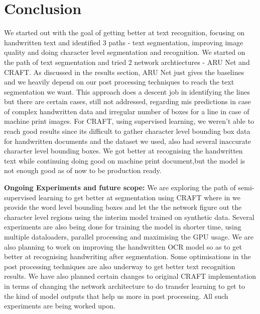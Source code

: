 %

{\let\clearpage\relax \chapter{Conclusion}}

We started out with the goal of getting better at text recognition, focusing on handwritten text and identified 3 paths - text segmentation, improving image quality and doing character level segmentation and recognition. We started on the path of text segmentation and tried 2 network archtiectures - ARU Net and CRAFT. As discussed in the results section, ARU Net just gives the baselines and we heavily depend on our post processing techniques to reach the text segmentation we want. This approach does a descent job in identifying the lines but there are certain cases, still not addressed,  regarding mis predictions in case of complex handwritten data and irregular number of boxes for a line in case of machine print images. For CRAFT, using supervised learning, we weren't able to reach good results since its difficult to gather character level bounding box data for handwritten documents and the dataset we used, also had several inaccurate character level bounding boxes. We got better at recognising the handwritten text while continuing doing good on machine print document,but the model is not enough good as of now to be production ready.

\textbf{Ongoing Experiments and future scope:} We are exploring the path of semi-supervised learning to get better at segmentation using CRAFT where in we provide the word level bounding boxes and let the the network figure out the character level regions using the interim model trained on synthetic data. Several experiments are also being done for training the model in shorter time, using multiple dataloaders, parallel processing and maximising the GPU usage. We are also planning to work on improving the handwritten OCR model so as to get better at recognising handwriting after segmentation. Some optimisations in the post processing techniques are also underway to get better text recognition results. We have also planned certain changes to original CRAFT implementation in terms of changing the network architecture to do transfer learning to get to the kind of model outputs that help us more in post processing. All such experiments are being worked upon. 


